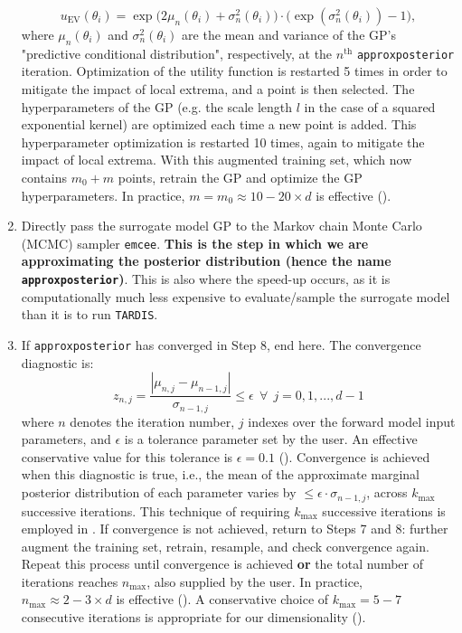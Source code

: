 \documentclass[twocolumn]{aastex63}
\begin{document}
\begin{enumerate}
    \begin{equation}
    u_{\mathrm{EV}}(\theta_i) = \exp\big(2\mu_n(\theta_i) + \sigma_n^2(\theta_i)\big)\cdot\big(\exp(\sigma_n^2(\theta_i)) - 1\big),
    \end{equation} 
    where $\mu_n(\theta_i)$ and $\sigma_n^2(\theta_i)$ are the mean and variance of the GP's "predictive conditional distribution", respectively, at the $n^{\mathrm{th}}$ \texttt{approxposterior} iteration. Optimization of the utility function is restarted 5 times in order to mitigate the impact of local extrema, and a point is then selected. The hyperparameters of the GP (e.g. the scale length $l$ in the case of a squared exponential kernel) are optimized each time a new point is added. This hyperparameter optimization is restarted 10 times, again to mitigate the impact of local extrema. With this augmented training set, which now contains $m_0 + m$ points, retrain the GP and optimize the GP hyperparameters.  In practice, $m = m_0 \approx 10-20 \times d$ is effective (\citealt{fleming20}).
    \item Directly pass the surrogate model GP to the Markov chain Monte Carlo (MCMC) sampler \texttt{emcee}. \textbf{This is the step in which we are approximating the posterior distribution (hence the name \texttt{approxposterior})}. This is also where the speed-up occurs, as it is computationally much less expensive to evaluate/sample the surrogate model than it is to run \texttt{TARDIS}. 
    \item If \texttt{approxposterior} has converged in Step 8, end here. The convergence diagnostic is: 
    \begin{equation}
    z_{n, j} = \frac{|\mu_{n, j} - \mu_{n-1, j}|}{\sigma_{n-1, j}} \leqslant \epsilon~~\forall~~j=0,1,...,d-1 
    \end{equation}
    where $n$ denotes the iteration number, $j$ indexes over the forward model input parameters, and $\epsilon$ is a tolerance parameter set by the user. An effective conservative value for this tolerance is $\epsilon=0.1$ (\citealt{fleming20}). Convergence is achieved when this diagnostic is true, i.e., the mean of the approximate marginal posterior distribution of each parameter varies by $\leqslant\epsilon\cdot\sigma_{n-1, j}$, across $k_{\mathrm{max}}$ successive iterations. This technique of requiring $k_{\mathrm{max}}$ successive iterations is employed in \cite{wang18}. If convergence is not achieved, return to Steps 7 and 8: further augment the training set, retrain, resample, and check convergence again. Repeat this process until convergence is achieved \textbf{or} the total number of iterations reaches $n_{\mathrm{max}}$, also supplied by the user. In practice, $n_{\mathrm{max}} \approx 2-3 \times d$ is effective (\citealt{fleming20}). A conservative choice of $k_{\mathrm{max}}=5-7$ consecutive iterations is appropriate for our dimensionality (\citealt{fleming20}).

\end{enumerate}
\end{document}
